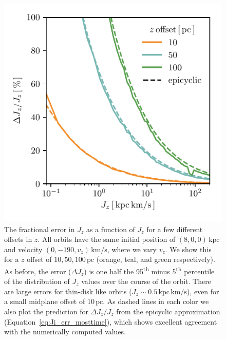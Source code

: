 \documentclass[twocolumn]{aastex62}
\newcommand{\pc}{\text{pc}}
\newcommand{\kpc}{\text{kpc}}
\newcommand{\kms}{\text{km}/\text{s}}
\newcommand{\actunit}{\text{kpc}\,\kms}
\newcommand{\uth}{\textsuperscript{th}}
\begin{document}
\begin{figure}
\begin{center}
\includegraphics[width=\columnwidth]{fig/schmactions_many_orbits_Jz_fun.pdf}
\end{center}
\caption{The fractional error in $J_z$ as a function of $J_z$ for a few
different offsets in $z$. All orbits have the same initial position of $(8, 0,
0)\,\kpc$ and velocity $(0, -190, v_z)\,\kms$, where we vary $v_z$. We show
this for a $z$ offset of $10, 50, 100\,\pc$ (orange, teal, and green
respectively). As before, the error ($\Delta J_z$) is one half the 95\uth{}
minus 5\uth{} percentile of the distribution of $J_z$ values over the
course of the orbit. There are large errors for thin-disk like orbits ($J_z
\sim 0.5\,\actunit$), even for a small midplane offset of $10\,\pc$. As dashed
lines in each color we also plot the prediction for $\Delta J_z/J_z$ from the
epicyclic approximation (Equation~\eqref{eq:Ji_err_mosttime}), which shows
excellent agreement with the numerically computed values.}
\label{fig:dJz_fun_Jz}
\end{figure}
\end{document}
